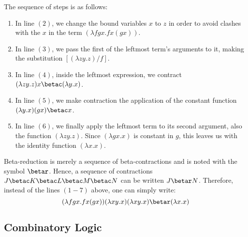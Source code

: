 The sequence of steps is as follows:
\begin{enumerate}
    \item In line $(2)$, we change the bound variables $x$ to $z$ in order to avoid clashes with the $x$ in the term $(\lambda fgx.fx(gx))$.
    \item In line $(3)$, we pass the first of the leftmost term's arguments to it, making the substitution $[(\lambda zy.z)/f]$.
    \item In line $(4)$, inside the leftmost expression, we contract $(\lambda zy.z)x \betac (\lambda y.x)$.
    \item In line $(5)$, we make contraction the application of the constant function $(\lambda y.x)(gx) \betac x$.
    \item In line $(6)$, we finally apply the leftmost term to its second argument, also the function $(\lambda zy.z)$. Since $(\lambda gx.x)$ is constant in $g$, this leaves us with the identity function $(\lambda x.x)$.
\end{enumerate}

Beta-reduction is merely a sequence of beta-contractions and is noted with the symbol $\betar$. Hence, a sequence of contractions $J\betac K\betac L\betac M\betac N$ can be written $J\betar N$. Therefore, instead of the lines $(1-7)$ above, one can simply write:
\begin{equation*}
    (\lambda fgx.fx(gx))(\lambda xy.x)(\lambda xy.x) \betar (\lambda x.x)
\end{equation*}

\subsection{Combinatory Logic}
\newcommand\Sc{\textbf S}
\newcommand\Kc{\textbf K}
\newcommand\Ic{\textbf I}

\newcommand\Cc{\textbf C}
\newcommand\Wc{\textbf W}
\newcommand\Bc{\textbf B}


